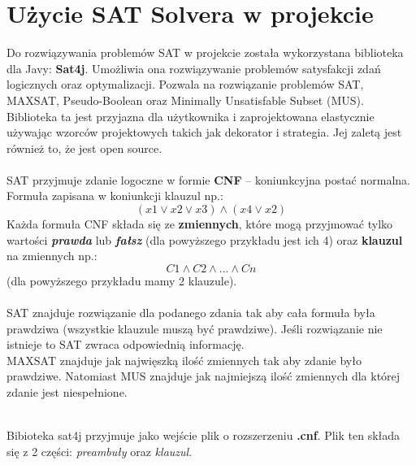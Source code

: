 \documentclass{article}
\begin{document}
\section{Użycie SAT Solvera w projekcie}
\par
Do rozwiązywania problemów SAT w projekcie została wykorzystana biblioteka dla Javy: \textbf{Sat4j}. Umożliwia ona rozwiązywanie problemów satysfakcji zdań logicznych oraz optymalizacji. Pozwala na rozwiązanie problemów SAT, MAXSAT, Pseudo-Boolean oraz Minimally Unsatisfable Subset (MUS). \\
Biblioteka ta jest przyjazna dla użytkownika i zaprojektowana elastycznie używając wzorców projektowych takich jak dekorator i strategia. Jej zaletą jest również to, że jest open source. \\ \\
SAT przyjmuje zdanie logoczne w formie \textbf{CNF} – koniunkcyjna postać normalna. Formuła zapisana w koniunkcji klauzul np.: $$ (x1 \vee x2 \vee x3) \wedge (x4 \vee x2) $$
Każda formuła CNF składa się ze \textbf{zmiennych}, które mogą przyjmować tylko wartości \textbf{\textit{prawda}} lub \textbf{\textit{fałsz}} (dla powyższego przykładu jest ich 4) oraz \textbf{klauzul} na zmiennych np.: $$ C1\wedge C2\wedge ...\wedge Cn $$(dla powyższego przykładu mamy 2 klauzule). \\ \\
SAT znajduje rozwiązanie dla podanego zdania tak aby cała formuła była prawdziwa (wszystkie klauzule muszą być prawdziwe). Jeśli rozwiązanie nie istnieje to SAT zwraca odpowiednią informację. \\
MAXSAT znajduje jak najwięszką ilość zmiennych tak aby zdanie było prawdziwe. Natomiast MUS znajduje jak najmiejszą ilość zmiennych dla której zdanie jest niespełnione. \\ \\
\par
Bibioteka sat4j przyjmuje jako wejście plik o rozszerzeniu \textbf{.cnf}. Plik ten składa się z 2 części:\textit{ preambuły} oraz \textit{klauzul}. 
\end{document}
